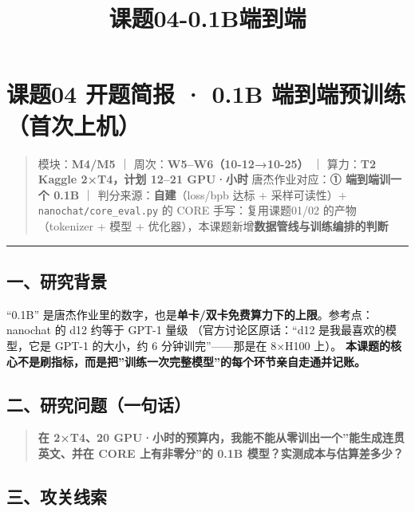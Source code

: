 \documentclass[
  chinese,
  11pt,
]{ctexart}
\title{课题04-0.1B端到端}
\author{}
\date{}
\begin{document}
\maketitle

{
\setcounter{tocdepth}{2}
\tableofcontents
}
\section{\texorpdfstring{课题04 开题简报 · 0.1B 端到端预训练（\textbf{首次上机}）}{课题04 开题简报 · 0.1B 端到端预训练（首次上机）}}\label{ux8bfeux989804-ux5f00ux9898ux7b80ux62a5-0.1b-ux7aefux5230ux7aefux9884ux8badux7ec3ux9996ux6b21ux4e0aux673a}

\begin{quote}
模块：\textbf{M4/M5} ｜ 周次：\textbf{W5--W6（10-12→10-25）} ｜ 算力：\textbf{T2 Kaggle 2×T4，计划 12--21 GPU·小时} 唐杰作业对应：\textbf{① 端到端训一个 0.1B} ｜ 判分来源：\textbf{自建}（loss/bpb 达标 + 采样可读性）+ \texttt{nanochat/core\_eval.py} 的 CORE 手写：复用课题01/02 的产物（tokenizer + 模型 + 优化器），本课题新增\textbf{数据管线与训练编排的判断}
\end{quote}

\begin{center}\rule{0.5\linewidth}{0.5pt}\end{center}

\subsection{一、研究背景}\label{ux4e00ux7814ux7a76ux80ccux666f}

``0.1B'' 是唐杰作业里的数字，也是\textbf{单卡/双卡免费算力下的上限}。参考点：nanochat 的 d12 约等于 GPT-1 量级 （官方讨论区原话：``d12 是我最喜欢的模型，它是 GPT-1 的大小，约 6 分钟训完''------那是在 8×H100 上）。 \textbf{本课题的核心不是刷指标，而是把''训练一次完整模型''的每个环节亲自走通并记账。}

\subsection{二、研究问题（一句话）}\label{ux4e8cux7814ux7a76ux95eeux9898ux4e00ux53e5ux8bdd}

\begin{quote}
\textbf{在 2×T4、20 GPU·小时的预算内，我能不能从零训出一个''能生成连贯英文、并在 CORE 上有非零分''的 0.1B 模型？实测成本与估算差多少？}
\end{quote}

\subsection{三、攻关线索}\label{ux4e09ux653bux5173ux7ebfux7d22}
\end{document}
